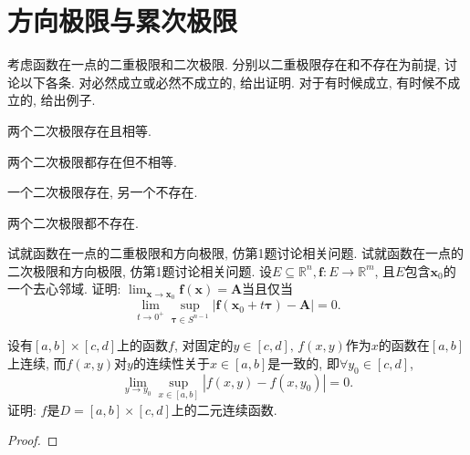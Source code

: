 \section{方向极限与累次极限}
\begin{quiza}
\woe 考虑函数在一点的二重极限和二次极限. 分别以二重极限存在和不存在为前提, 讨论以下各条. 对必然成立或必然不成立的, 给出证明. 对于有时候成立, 有时候不成立的, 给出例子.
\begin{quizcs}
\item 两个二次极限存在且相等.
\item 两个二次极限都存在但不相等.
\item 一个二次极限存在, 另一个不存在.
\item 两个二次极限都不存在.
\end{quizcs}
\woe 试就函数在一点的二重极限和方向极限, 仿第1题讨论相关问题.
\woe 试就函数在一点的二次极限和方向极限, 仿第1题讨论相关问题.
\woe 设\(E\subseteq\mathbb{R}^n,\boldsymbol{f}:E\rightarrow\mathbb{R}^m\), 且\(E\)包含\(\boldsymbol{x}_0\)的一个去心邻域. 证明: \(\lim_{\boldsymbol{x}\rightarrow\boldsymbol{x}_0}\boldsymbol{f}(\boldsymbol{x})=\boldsymbol{A}\)当且仅当\[\lim_{t\rightarrow0^+}\sup_{\boldsymbol{\tau}\in S^{n-1}}\left|\boldsymbol{f}(\boldsymbol{x}_0+t\boldsymbol{\tau})-\boldsymbol{A}\right|=0.\]
\end{quiza}
\begin{quizb}
\woe 设有\([a,b]\times[c,d]\)上的函数\(f\), 对固定的\(y\in[c,d],\,f(x,y)\)作为\(x\)的函数在\([a,b]\)上连续, 而\(f(x,y)\)对\(y\)的连续性关于\(x\in [a,b]\)是一致的, 即\(\forall y_0\in[c,d]\),\[\lim_{y\rightarrow y_0}\sup_{x\in [a,b]}\left|f(x,y)-f(x,y_0)\right|=0.\]证明: \(f\)是\(D=[a,b]\times [c,d]\)上的二元连续函数.
\begin{proof}
	
\end{proof}
\end{quizb}